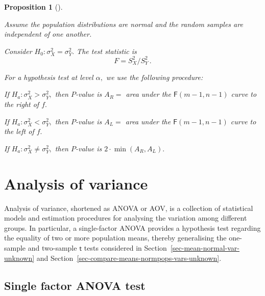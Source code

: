 \documentclass[
  a4paper,
  DIV=11,
  numbers=noendperiod,
  oneside]{scrreprt}
\theoremstyle{plain}
\theoremstyle{definition}
\theoremstyle{definition}
\theoremstyle{definition}
\theoremstyle{plain}
\newtheorem{proposition}{Proposition}[chapter]
\theoremstyle{remark}
\begin{document}
\begin{proposition}[]\protect\hypertarget{prp-htest-compre-variances}{}\label{prp-htest-compre-variances}

Assume the population distributions are normal and the random samples
are independent of one another.

Consider \(H_0 : \sigma_X^2 = \sigma_Y^2.\) The test statistic is \[
 F = S_X^2 / S_Y^2 \,.
\]

For a hypothesis test at level \(\alpha,\) we use the following
procedure:

If \(H_a : \sigma_X^2 > \sigma_Y^2,\) then \(P\)-value is \(A_R = {}\)
area under the \(\mathsf{F}(m-1, n-1)\) curve to the right of \(f.\)

If \(H_a : \sigma_X^2 < \sigma_Y^2,\) then \(P\)-value is \(A_L = {}\)
area under the \(\mathsf{F}(m-1, n-1)\) curve to the left of \(f.\)

If \(H_a : \sigma_X^2 \neq \sigma_Y^2,\) then \(P\)-value is
\(2 \cdot \min(A_R, A_L).\)

\end{proposition}

\chapter{Analysis of variance}\label{sec-anova}

Analysis of variance, shortened as ANOVA or AOV, is a collection of
statistical models and estimation procedures for analysing the variation
among different groups. In particular, a single-factor ANOVA provides a
hypothesis test regarding the equality of two or more population means,
thereby generalising the one-sample and two-sample \(\mathsf{t}\) tests
considered in Section~\ref{sec-mean-normal-var-unknown} and
Section~\ref{sec-compare-means-normpops-vars-unknown}.

\section{Single factor ANOVA test}\label{sec-anova-single-factor-test}
\end{document}

